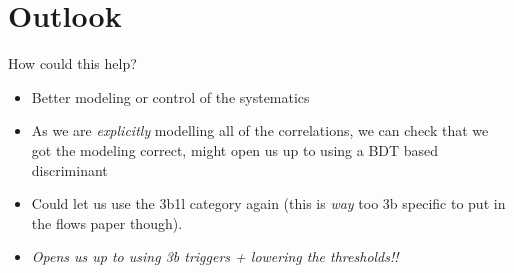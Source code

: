 \section{Outlook}
\label{sec:flows-outlook}

How could this help?

 \begin{itemize}
     \item Better modeling or control of the systematics
     \item As we are \emph{explicitly} modelling all of the correlations, we can check that we got the modeling correct, might open us up to using a BDT based discriminant
     \item Could let us use the 3b1l category again (this is \emph{way} too 3b specific to put in the flows paper though).
     \item \emph{Opens us up to using 3b triggers + lowering the thresholds!!}
 \end{itemize}

